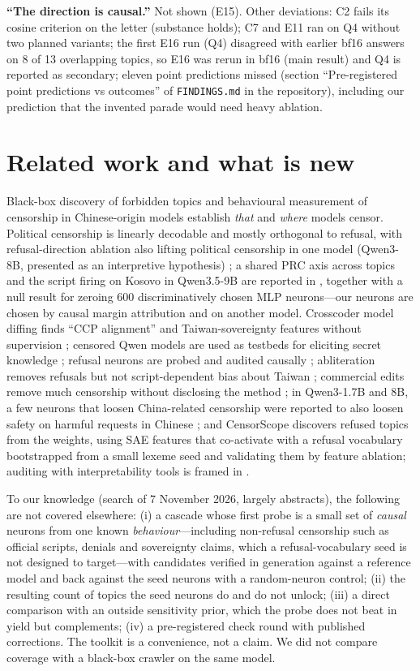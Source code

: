 \documentclass[10pt,a4paper]{article}
\begin{document}
\textbf{``The direction is causal.''} Not shown (E15). Other deviations: C2 fails its cosine criterion on the letter
(substance holds); C7 and E11 ran on Q4 without two planned variants; the first E16 run (Q4) disagreed with earlier bf16
answers on 8 of 13 overlapping topics, so E16 was rerun in bf16 (main result) and Q4 is reported as secondary; eleven point
predictions missed (section ``Pre-registered point predictions vs outcomes'' of \texttt{FINDINGS.md} in the repository), including our prediction that the invented parade would need heavy ablation.

\section{Related work and what is new}
Black-box discovery of forbidden topics \cite{ipc} and behavioural measurement of censorship in Chinese-origin models
\cite{panxu,ceias,r1dacted} establish \emph{that} and \emph{where} models censor. Political censorship is linearly decodable
and mostly orthogonal to refusal, with refusal-direction ablation also lifting political censorship in one model
(Qwen3-8B, presented as an interpretive hypothesis) \cite{frank}; a shared PRC axis across topics and the script firing on Kosovo in Qwen3.5-9B are reported in \cite{vas},
together with a null result for zeroing 600 discriminatively chosen MLP neurons---our neurons are chosen by causal margin
attribution and on another model. Crosscoder model diffing finds ``CCP alignment'' and Taiwan-sovereignty features without
supervision \cite{jb}; censored Qwen models are used as testbeds for eliciting secret knowledge \cite{casademunt}; refusal
neurons are probed and audited causally \cite{pp,selectors,cna}; abliteration removes refusals but not script-dependent
bias about Taiwan \cite{ko}; commercial edits remove much censorship without disclosing the method \cite{interpretic}; in Qwen3-1.7B and 8B, a few neurons that
loosen China-related censorship were reported to also loosen safety on harmful requests in Chinese \cite{chang}; and CensorScope
\cite{censorscope} discovers refused topics from the weights, using SAE features that co-activate with a refusal vocabulary
bootstrapped from a small lexeme seed and validating them by feature ablation;
auditing with interpretability tools is framed in \cite{marks}.

To our knowledge (search of 7 November 2026, largely abstracts), the following are not covered elsewhere: (i) a cascade whose
first probe is a small set of \emph{causal} neurons from one known \emph{behaviour}---including non-refusal censorship such as
official scripts, denials and sovereignty claims, which a refusal-vocabulary seed \cite{censorscope} is not designed to target---with
candidates verified in generation against a reference model and back against the seed neurons with a random-neuron control; (ii) the resulting
count of topics the seed neurons do and do not unlock; (iii) a direct comparison with an outside sensitivity prior, which the
probe does not beat in yield but complements; (iv) a pre-registered check round with published corrections. The
toolkit is a convenience, not a claim. We did not compare coverage with a black-box crawler on the same model.
\end{document}
